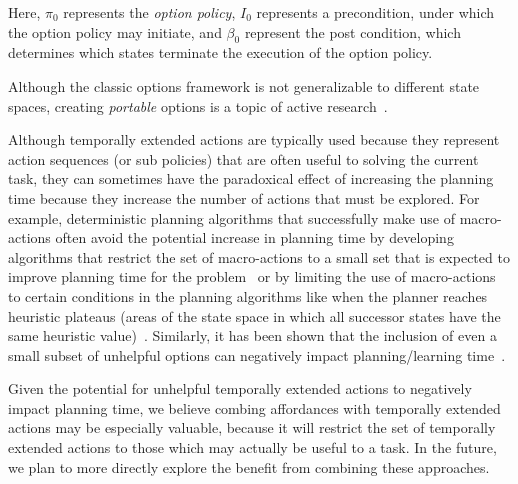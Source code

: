 \documentclass[]{article}
\begin{document}
Here, $\pi_0$ represents the {\it option policy}, $I_0$ represents
a precondition, under which the option policy may initiate, and 
$\beta_0$ represent the post condition, which determines which 
states terminate the execution of the option policy.

Although the classic options framework is not generalizable to different state spaces,
creating {\em portable} options is a topic of active research~\citep{konidaris07,konidaris2009efficient,Ravindran03analgebraic,croonenborghs2008learning,andre2002state,konidaris2012transfer}.

Although temporally extended actions are typically used
because they represent action sequences (or sub policies) that are often useful to solving
the current task, they can sometimes have the paradoxical effect
of increasing the planning time because they increase the number of actions that must be explored.
For example, deterministic planning algorithms that successfully make use of macro-actions often avoid the potential increase
in planning time by developing algorithms that restrict the set of macro-actions to a small set that is expected to improve planning time for the problem~\citep{Botea:2005kx,Newton:2005vn} or by limiting the use of macro-actions to certain conditions
in the planning algorithms like when the planner reaches heuristic plateaus (areas of the state space in which all successor states have the same heuristic value)~\cite{Coles:2007ys}. Similarly, it has been shown that the inclusion
of even a small subset of unhelpful options can negatively impact planning/learning time~\cite{Jong:2008zr}.

Given the potential for unhelpful temporally extended actions to negatively impact planning time, we believe combing affordances with temporally extended actions
may be especially valuable, because it will restrict the set of temporally extended actions to those
which may actually be useful to a task. In the future, we plan to more directly explore the benefit from combining
these approaches.


\end{document}
